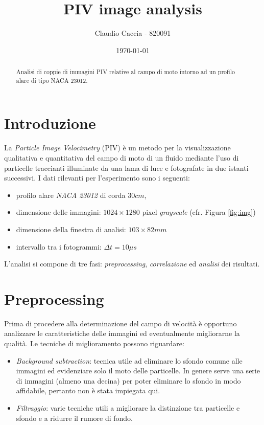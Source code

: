 \documentclass[a4paper]{article}
\title{PIV image analysis}
\author{Claudio Caccia - 820091}
\date{\today}
\begin{document}
\maketitle

\begin{abstract}
Analisi di coppie di immagini PIV relative al campo di moto intorno ad un profilo alare di tipo NACA 23012. 
\end{abstract}

\section{Introduzione}
\label{sec:intro}

La \textit{Particle Image Velocimetry} (PIV) è un metodo per la visualizzazione qualitativa e quantitativa del campo di moto di un fluido mediante l'uso di particelle traccianti illuminate da una lama di luce e fotografate in due istanti successivi. I dati rilevanti per l'esperimento sono i seguenti:
\begin{itemize}
	\item profilo alare \textit{NACA 23012} di corda $30cm$,
	\item dimensione delle immagini: $1024 \times 1280$ pixel \textit{grayscale} (cfr. Figura \ref{fig:img}) 
	\item dimensione della finestra di analisi: $103\times82mm$
	\item intervallo tra i fotogrammi: $\Delta t = 10\mu s$
\end{itemize}

L'analisi si compone di tre fasi: \textit{preprocessing}, \textit{correlazione} ed \textit{analisi} dei risultati.

\section{Preprocessing}

Prima di procedere alla determinazione del campo di velocit\`{a} \`{e} opportuno analizzare le caratteristiche delle immagini ed eventualmente migliorarne la qualit\`{a}. Le tecniche di miglioramento possono riguardare:

\begin{itemize}
	\item \textit{Background subtraction}: tecnica utile ad eliminare lo sfondo comune alle immagini ed evidenziare solo il moto delle particelle. In genere serve una serie di immagini (almeno una decina) per poter eliminare lo sfondo in modo affidabile, pertanto non è stata impiegata qui.
	\item \textit{Filtraggio}:  varie tecniche utili a migliorare la distinzione tra particelle e sfondo e a ridurre il rumore di fondo.
\end{itemize}
\end{document}
